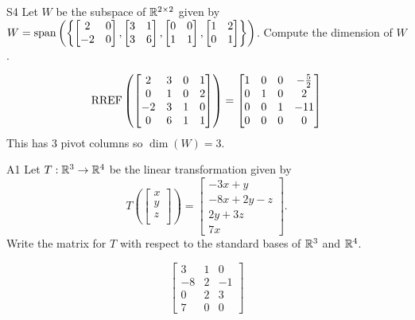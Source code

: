 \documentclass{sbgLAexam}
\begin{document}
\begin{problem}{S4}
Let $W$ be the subspace of $\mathbb{R}^{2\times2}$ given by $W={\rm span}\left(\left\{\begin{bmatrix} 2 & 0 \\ -2 & 0 \end{bmatrix}, \begin{bmatrix} 3 & 1 \\ 3 & 6 \end{bmatrix}, \begin{bmatrix} 0 & 0 \\ 1 & 1 \end{bmatrix}, \begin{bmatrix}1 & 2 \\ 0 & 1 \end{bmatrix}\right\}\right)$. Compute the dimension of $W$.
\end{problem}
\begin{solution}
$$\operatorname{RREF}\left( \begin{bmatrix} 2 & 3 & 0 & 1 \\ 0 & 1 & 0 & 2 \\ -2 & 3 & 1 & 0 \\ 0 & 6 & 1 & 1\end{bmatrix} \right) = \begin{bmatrix}1 & 0 & 0 & -\frac{5}{2} \\ 0 & 1 & 0 & 2 \\ 0 & 0 & 1 & -11\\ 0 & 0 & 0 & 0  \end{bmatrix} $$
This has 3 pivot columns so  $\dim(W) =3$.
\end{solution}


\begin{extract}\newpage\end{extract}
\begin{problem}{A1}
Let $T: \mathbb{R}^3\rightarrow \mathbb{R}^4$ be the linear transformation given by $$T\left(\begin{bmatrix} x \\ y \\ z \\  \end{bmatrix} \right) = \begin{bmatrix} -3x+y \\ -8x+2y-z \\ 2y+3z \\ 7x \end{bmatrix}.$$  Write the matrix for $T$ with respect to the standard bases of $\mathbb{R}^3$ and $\mathbb{R}^4$.
\end{problem}
\begin{solution}
$$\begin{bmatrix} 3 & 1 & 0 \\ -8 & 2 & -1 \\ 0 & 2 & 3 \\ 7 & 0 & 0 \end{bmatrix}$$
\end{solution}
\end{document}
